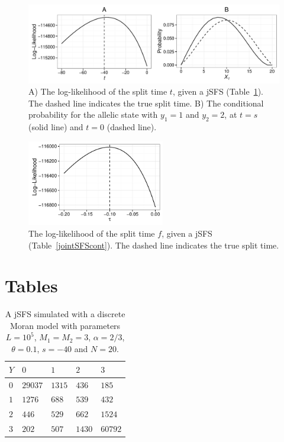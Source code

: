 \documentclass[preprint]{elsarticle}
\newcommand\y{\ensuremath{Y}}
\begin{document}
{\begin{figure}[ht]
\includegraphics[width = 12cm]{twoPop_29_8_2016.pdf}
\caption{A) The log-likelihood of the split time $t$, given a jSFS (Table~\ref{jointSFSdiscr}). The dashed line indicates the true split time. B) The conditional probability for the allelic state with $y_1=1$ and $y_2=2$, at $t=s$ (solid line) and $t=0$ (dashed line).}\label{twoPopdiscr}
\end{figure}

\begin{figure}[ht]
\includegraphics[width = 6cm]{forw_back_ll_cont.pdf}
\caption{The log-likelihood of the split time $f$, given a jSFS (Table~\ref{jointSFScont}). The dashed line indicates the true split time.}\label{twoPopcont}
\end{figure}

\clearpage

\section*{Tables}

\begin{table}[ht]
\centering
\caption{A jSFS simulated with a discrete Moran model with parameters $L=10^5$, $M_1=M_2=3$, $\alpha=2/3$, $\theta=0.1$, $s=-40$ and $N=20$.}
  \begin{tabular}{lllll}
  \toprule
    $\y$&$0$&$1$&$2$&$3$\\
    \midrule
    $0$  &$29037$ &$1315$ &$436$  &$185$\\ 
    $1$  &$1276$  &$688$  &$539$  &$432$\\  
    $2$  &$446$   &$529$  &$662$  &$1524$\\  
    $3$  &$202$   &$507$  &$1430$ &$60792$\\
    \bottomrule
  \end{tabular}\label{jointSFSdiscr}
\end{table}

}
\end{document}
